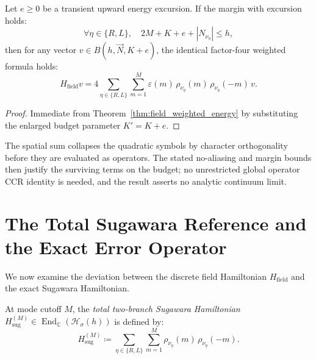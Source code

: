 \begin{theorem}
\label{thm:field_weighted_after_excursion}
Let $e \ge 0$ be a transient upward energy excursion. If the margin with excursion holds:
\begin{equation}
\forall \eta \in \{R, L\}, \quad 2M + K + e + |N_{\nu_\eta}| \le h,
\end{equation}
then for any vector $v \in B(h, \vec{N}, K + e)$, the identical factor-four weighted formula holds:
\begin{equation}
H_{\mathrm{field}} v = 4 \sum_{\eta \in \{R, L\}} \sum_{m=1}^M \varepsilon(m)\, \rho_{\nu_\eta}(m)\, \rho_{\nu_\eta}(-m)\, v.
\end{equation}
\end{theorem}

\begin{proof}
Immediate from Theorem~\ref{thm:field_weighted_energy} by substituting the enlarged budget parameter $K' = K + e$.
\end{proof}

\begin{remark}
The spatial sum collapses the quadratic symbols by character orthogonality before they are evaluated as operators. The stated no-aliasing and margin bounds then justify the surviving terms on the budget; no unrestricted global operator CCR identity is needed, and the result asserts no analytic continuum limit.
\end{remark}

\section{The Total Sugawara Reference and the Exact Error Operator}

We now examine the deviation between the discrete field Hamiltonian $H_{\mathrm{field}}$ and the exact Sugawara Hamiltonian.

\begin{definition}
At mode cutoff $M$, the \emph{total two-branch Sugawara Hamiltonian} $H_{\mathrm{sug}}^{(M)} \in \operatorname{End}_{\mathbb{C}}(\mathcal{H}_\sigma(h))$ is defined by:
\begin{equation}
H_{\mathrm{sug}}^{(M)} \coloneqq \sum_{\eta \in \{R, L\}} \sum_{m=1}^M \rho_{\nu_\eta}(m)\, \rho_{\nu_\eta}(-m).
\end{equation}
\end{definition}

